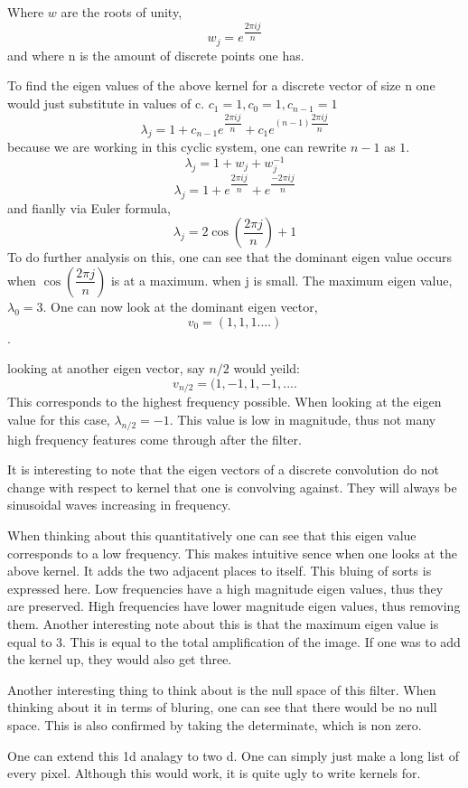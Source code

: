 \documentclass[11pt]{article}
\begin{document}
Where $w$ are the roots of unity,
$$w_j = e^{\dfrac{2\pi i j}{n}}$$
and where n is the amount of discrete points one has.
 
 To find the eigen values of the above kernel for a discrete vector of size n one would just substitute in values of c. $c_1 = 1, c_0 = 1, c_{n-1}=1$
 $$\lambda_j =1+c_{n-1}e^{\dfrac{2\pi i j}{n}}+c_{1}e^{(n-1) \dfrac{2\pi i j}{n}}$$
 because we are working in this cyclic system, one can rewrite $n-1$ as $1$. 
 $$\lambda_j = 1+w_j+w_j^{-1}$$
 $$\lambda_j =1+e^{\dfrac{2\pi i j}{n}}+e^{\dfrac{-2\pi i j}{n}}$$
and fianlly via Euler formula, 
$$\lambda_j = 2 \cos(\dfrac{2\pi j}{n})+1$$
To do further analysis on this, one can see that the dominant eigen value occurs when $\cos(\dfrac{2 \pi j}{n})$ is at a maximum. when j is small. The maximum eigen value, $\lambda_0 = 3$. 
One can now look at the dominant eigen vector,
$$v_0 = (1,1,1....)$$. 

looking at another eigen vector, say $n/2$ would yeild: 
$$v_{n/2} = (1, -1, 1, -1, ....$$ This corresponds to the highest frequency possible. When looking at the eigen value for this case, $\lambda_{n/2}=-1$. This value is low in magnitude, thus not many high frequency features come through after the filter.

It is interesting to note that the eigen vectors of a discrete convolution do not change with respect to kernel that one is convolving against. They will always be sinusoidal waves increasing in frequency. 

When thinking about this quantitatively one can see that this eigen value corresponds to a low frequency. This makes intuitive sence when one looks at the above kernel. It adds the two adjacent places to itself. This bluing of sorts is expressed here. Low frequencies have a high magnitude eigen values, thus they are preserved. High frequencies have lower magnitude eigen values, thus removing them.
Another interesting note about this is that the maximum eigen value is equal to 3. This is equal to the total amplification of the image. If one was to add the kernel up, they would also get three. 

Another interesting thing to think about is the null space of this filter. When thinking about it in terms of bluring, one can see that there would be no null space. This is also confirmed by taking the determinate, which is non zero. 

One can extend this 1d analagy to two d. One can simply just make a long list of every pixel. Although this would work, it is quite ugly to write kernels for. 
\end{document}
